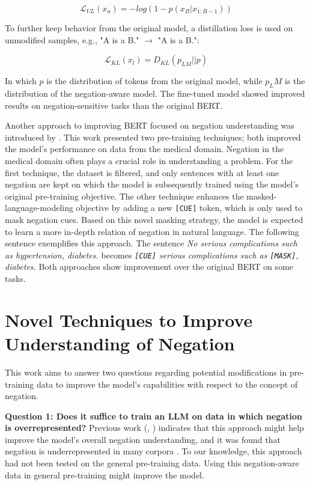 \documentclass{article}
\begin{document}
$$ \mathcal L_{UL}(x_u) = - log(1 - p(x_B | x_{1:B-1})) $$

To further keep behavior from the original model, a distillation loss is used on unmodified samples, e.g., "A is a B." $\rightarrow$ "A is a B.":

$$ \mathcal L_{KL}(x_l) = D_{KL}(p_{LM}|| p) $$

In which $p$ is the distribution of tokens from the original model, while $p_LM$ is the distribution of the negation-aware model.
The fine-tuned model showed improved results on negation-sensitive tasks than the original BERT.

Another approach to improving BERT focused on negation understanding was introduced by \cite{TruongImprovingNegation2022}. This work presented two pre-training techniques; both improved the model's performance on data from the medical domain. Negation in the medical domain often plays a crucial role in understanding a problem.
For the first technique, the dataset is filtered, and only sentences with at least one negation are kept on which the model is subsequently trained using the model's original pre-training objective.
The other technique enhances the masked-language-modeling objective by adding a new \texttt{[CUE]} token, which is only used to mask negation cues. Based on this novel masking strategy, the model is expected to learn a more in-depth relation of negation in natural language. The following sentence exemplifies this approach. The sentence \textit{No serious complications such as hypertension, diabetes.} becomes \textit{\texttt{[CUE]} serious complications such as \texttt{[MASK]}, diabetes.} Both approaches show improvement over the original BERT on some tasks.


\section{Novel Techniques to Improve Understanding of Negation}
\label{section::questions}

This work aims to answer two questions regarding potential modifications in pre-training data to improve the model's capabilities with respect to the concept of negation.

\textbf{Question 1: Does it suffice to train an LLM on data in which negation is overrepresented?} Previous work (\cite{hossain-etal-2022-analysis}, \cite{TruongImprovingNegation2022}) indicates that this approach might help improve the model's overall negation understanding, and it was found that negation is underrepresented in many corpora \citep{hossain-etal-2022-analysis}. To our knowledge, this approach had not been tested on the general pre-training data. Using this negation-aware data in general pre-training might improve the model.
\end{document}
